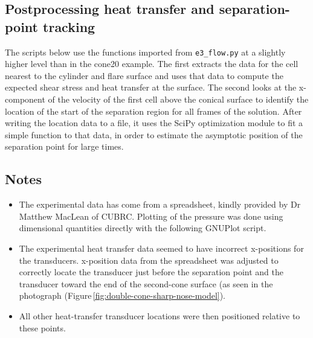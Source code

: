 \clearpage
\subsection{Postprocessing heat transfer and separation-point tracking}
\label{double-cone-sharp-nose-post-processing}
%
The scripts below use the functions imported from \texttt{e3\_flow.py}
at a slightly higher level than in the cone20 example.
The first extracts the data for the cell nearest to the cylinder and flare surface
and uses that data to compute the expected shear stress and heat transfer at the surface.
The second looks at the x-component of the velocity of the first cell above the 
conical surface to identify the location of the start of the separation region
for all frames of the solution.
After writing the location data to a file, it uses the SciPy optimization module 
to fit a simple function to that data, 
in order to estimate the asymptotic position of the separation point for large times.

\noindent
\topbar

\bottombar

\noindent
\topbar

\bottombar

\subsection{Notes}
\begin{itemize}
 \item The experimental data has come from a spreadsheet, 
 kindly provided by Dr Matthew MacLean of CUBRC.
 Plotting of the pressure was done using dimensional quantities directly with the following GNUPlot script.
 
 \item The experimental heat transfer data seemed to have incorrect x-positions
 for the transducers.  
 x-position data from the spreadsheet was adjusted to correctly locate the transducer just before
 the separation point and the transducer toward the end of the second-cone surface (as seen in
 the photograph (Figure\,\ref{fig:double-cone-sharp-nose-model}).
 
 \item All other heat-transfer transducer locations were then positioned relative to these points.
 
\end{itemize}
